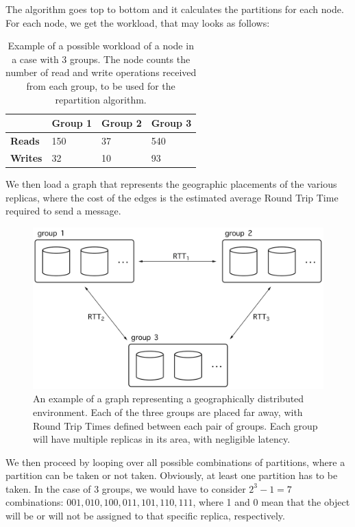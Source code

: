 The algorithm goes top to bottom and it calculates the partitions for each node. For each node, we get the workload, that may looks as follows:

\begin{table}[!htb]
  \centering
  \begin{tabular}{l l l l}
    \hline
    & \textbf{Group 1} & \textbf{Group 2} & \textbf{Group 3} \\
    \hline
    \textbf{Reads} & 150 & 37 & 540 \\
    \textbf{Writes} & 32 & 10 & 93 \\
    \hline
  \end{tabular}
  \caption{Example of a possible workload of a node in a case with 3 groups. The node counts the number of read and write operations received from each group, to be used for the repartition algorithm.}\label{tab:workload-example}
\end{table}

We then load a graph that represents the geographic placements of the various replicas, where the cost of the edges is the estimated average Round Trip Time required to send a message.

\begin{figure}[!htb]
  \centering
  \includegraphics[width=\textwidth,height=\textheight,keepaspectratio]{img/graph.png}
  \caption[caption]{An example of a graph representing a geographically distributed environment. Each of the three groups are placed far away, with Round Trip Times defined between each pair of groups. Each group will have multiple replicas in its area, with negligible latency.}
  \label{fig:graph}
\end{figure}

We then proceed by looping over all possible combinations of partitions, where a partition can be taken or not taken. Obviously, at least one partition has to be taken. In the case of 3 groups, we would have to consider $2^3 -1 = 7$ combinations: $001, 010, 100, 011, 101, 110, 111$, where 1 and 0 mean that the object will be or will not be assigned to that specific replica, respectively.

